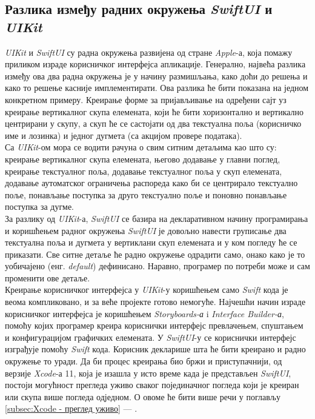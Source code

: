 \documentclass[12pt,oneside]{memoir}
\begin{document}
\subsection{Разлика између радних окружења \textit{SwiftUI} и \textit{UIKit}}
\label{subsec:Разлика SwiftUI и UIKit}

\indent \textit{UIKit} и \textit{SwiftUI} су радна окружења развијена од стране \textit{Apple}-а, која помажу приликом израде корисничког интерфејса апликације. Генерално, највећа разлика између ова два радна окружења је у начину размишљања, како доћи до решења и како то решење касније имплементирати. Ова разлика ће бити показана на једном конкретном примеру. Креирање форме за пријављивање на одређени сајт уз креирање вертикалног скупа елемената, који ће бити хоризонтално и вертикално центрирани у скупу, а скуп ће се састојати од два текстуална поља (корисничко име и лозинка) и једног дугмета (са акцијом провере података).
\\
\indent Са \textit{UIKit}-ом мора се водити рачуна о свим ситним детаљима као што су: креирање вертикалног скупа елемената, његово додавање у главни поглед, креирање текстуалног поља, додавање текстуалног поља у скуп елемената, додавање аутоматског ограничења распореда како би се центрирало текстуално поље, понављање поступка за друго текстуално поље и поновно понављање поступка за дугме. 
\\
\indent За разлику од \textit{UIKit}-а, \textit{SwiftUI} се базира на декларативном начину програмирања и коришћењем радног окружења \textit{SwiftUI} је довољно навести груписање два текстуална поља и дугмета у вертиклани скуп елемената и у ком погледу ће се приказати. Све ситне детаље ће радно окружење одрадити само, онако како је то уобичајено (енг. \textit{default}) дефинисано. Наравно, програмер по потреби може и сам променити ове детаље.
\\
\indent Креирање корисничког интерфејса у \textit{UIKit}-у коришћењем само \textit{Swift} кода је веома компликовано, и за веће пројекте готово немогуће. Најчешћи начин израде корисничког интерфејса је коришћењем \textit{Storyboards-а} i \textit{Interface Builder-а}, помоћу којих програмер креира кориснички интерфејс превлачењем, спуштањем и конфигурацијом графичких елемената. У \textit{SwiftUI}-у се кориснички интерфејс изграђује помоћу \textit{Swift} кода. Корисник декларише шта ће бити креирано и радно окружење то уради. Да би процес креирања био бржи и приступачнији, од верзије \textit{Xcode}-а 11, која је изашла у исто време када је представљен \textit{SwiftUI}, постоји могућност прегледа уживо сваког појединачног погледа који је креиран или скупа више погледа одједном. О овоме ће бити више речи у поглављу \ref{subsec:Xcode - преглед уживо} --- .
\end{document}
